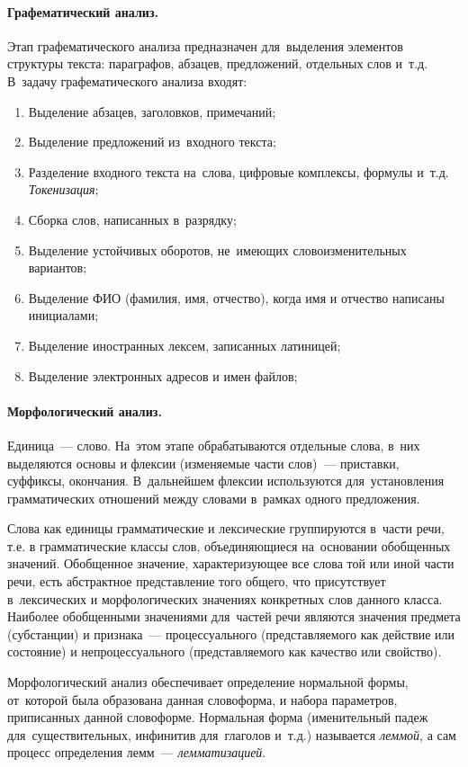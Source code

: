 \documentclass[12pt]{article}
\theoremstyle{definition}
\theoremstyle{remark}
\numberwithin{equation}{section}
\begin{document}
\paragraph{Графематический анализ.} Этап графематического 
анализа предназначен для~выделения элементов структуры текста: 
параграфов, абзацев, предложений, отдельных слов и~т.д. 
В~задачу графематического анализа входят:
\begin{enumerate}[label=---]
    \item Выделение абзацев, заголовков, примечаний;
    \item Выделение предложений из~входного текста;
    \item Разделение входного текста на~слова, цифровые комплексы, 
    формулы и~т.д. {\sl Токенизация};
    \item Сборка слов, написанных в~разрядку;
    \item Выделение устойчивых оборотов, не~имеющих словоизменительных 
    вариантов;
    \item Выделение ФИО (фамилия, имя, отчество), когда имя и отчество 
    написаны инициалами;
    \item Выделение иностранных лексем, записанных латиницей;
    \item Выделение электронных адресов и имен файлов;
\end{enumerate}

\paragraph{Морфологический анализ.} Единица~--- слово. На~этом этапе 
обрабатываются отдельные слова, в~них выделяются основы и флексии 
(изменяемые части слов)~--- приставки, суффиксы, окончания. 
В~дальнейшем флексии используются для~установления грамматических 
отношений между словами в~рамках одного предложения.

Слова как единицы грамматические и лексические группируются 
в~части речи, т.е. в грамматические классы слов, объединяющиеся 
на~основании обобщенных значений. Обобщенное значение, характеризующее 
все слова той или иной части речи, есть абстрактное представление 
того общего, что присутствует в~лексических и морфологических значениях 
конкретных слов данного класса. Наиболее обобщенными значениями 
для~частей речи являются значения предмета (субстанции) и признака~--- 
процессуального (представляемого как действие или состояние) и 
непроцессуального (представляемого как качество или свойство).

Морфологический анализ обеспечивает определение нормальной
формы, от~которой была образована данная словоформа, и набора 
параметров, приписанных данной словоформе. Нормальная форма 
(именительный падеж для~существительных, инфинитив для~глаголов 
и~т.д.) называется {\sl леммой}, а сам процесс определения лемм~--- 
{\sl лемматизацией}.
\end{document}
